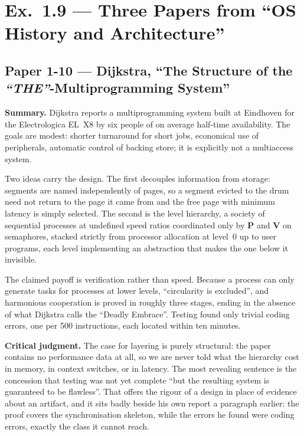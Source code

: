 \section*{Ex.\ 1.9 --- Three Papers from ``OS History and Architecture''}
\label{p3:sec:ex19}


\subsection*{Paper 1-10 --- Dijkstra, ``The Structure of the \textit{``THE''}-Multiprogramming System''}
\label{p3:sec:the}

\textbf{Summary.}
Dijkstra reports a multiprogramming system built at Eindhoven for the Electrologica
EL~X8 by six people of on average half-time availability. The goals are modest: shorter
turnaround for short jobs, economical use of peripherals, automatic control of backing
store; it is explicitly not a multiaccess system.

Two ideas carry the design. The first decouples information from storage: segments are
named independently of pages, so a segment evicted to the drum need not return to the
page it came from and the free page with minimum latency is simply selected. The second
is the level hierarchy, a society of sequential processes at undefined speed ratios
coordinated only by \textbf{P} and \textbf{V} on semaphores, stacked strictly from
processor allocation at level~0 up to user programs, each level implementing an
abstraction that makes the one below it invisible.

The claimed payoff is verification rather than speed. Because a process can only generate
tasks for processes at lower levels, ``circularity is excluded'', and harmonious
cooperation is proved in roughly three stages, ending in the absence of what Dijkstra
calls the ``Deadly Embrace''. Testing found only trivial coding errors, one per 500
instructions, each located within ten minutes.

\textbf{Critical judgment.}
The case for layering is purely structural: the paper contains no performance data at
all, so we are never told what the hierarchy cost in memory, in context switches, or in
latency. The most revealing sentence
is the concession that testing was not yet complete ``but the resulting system is
guaranteed to be flawless''. That offers the rigour of a design in place of evidence
about an artifact, and it sits badly beside his own report a paragraph earlier: the proof
covers the synchronisation skeleton, while the errors he found were coding errors,
exactly the class it cannot reach.

